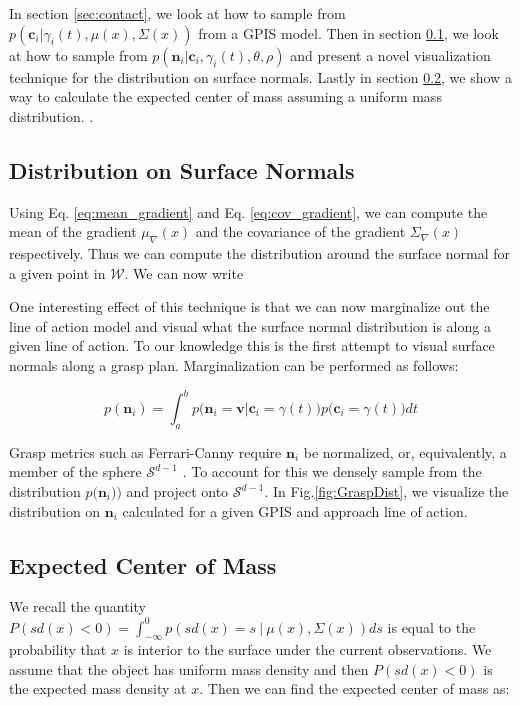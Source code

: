 \documentclass[letterpaper, 10 pt, conference]{ieeeconf}  %
\begin{document}
 In section \ref{sec:contact}, we look at how to sample from $p(\textbf{c}_i|\gamma_i(t),\mu(x),\Sigma(x))$ from a GPIS model. Then in section \ref{sec:normals}, we look at how to sample from $p(\textbf{n}_i|\textbf{c}_i,\gamma_i(t),\theta,\rho)$ and present a novel visualization technique for the distribution on surface normals. Lastly in section \ref{sec:mass}, we show a way to calculate the expected center of mass assuming a uniform mass distribution. 
 .
\subsection{Distribution on Surface Normals}\label{sec:normals} 
Using Eq. \ref{eq:mean_gradient} and Eq. \ref{eq:cov_gradient}, we can compute the mean of the gradient $ \mu_{\nabla}(x)$ and the covariance of the gradient $\Sigma_{\nabla}(x)$ respectively. Thus we can compute the distribution around the surface normal for a given point in $\mathcal{W}$. We can now write 

One interesting effect of this technique is that we can now marginalize out the line of action model and visual what the surface normal distribution is along a given line of action. To our knowledge this is the first attempt to visual surface normals along a grasp plan. Marginalization can be performed as follows:

\vspace{-2ex}
\begin{equation}
    p(\textbf{n}_i ) = \int_a^b   p\big(\textbf{n}_i = \textbf{v} | \textbf{c}_i = \gamma(t) \big)p\big(\textbf{c}_i = \gamma(t)\big) dt \label{eq:normal_dist}
\end{equation}

Grasp metrics such as  Ferrari-Canny require $\textbf{n}_i$ be normalized, or, equivalently, a member of the sphere $\mathcal{S}^{d-1}$ \cite{ferrari1992}. To account for this we densely sample from the  distribution $p \big(\textbf{n}_i ) \big)$  and project onto $\mathcal{S}^{d-1}$.  In Fig.\ref{fig:GraspDist}, we visualize the distribution on $\textbf{n}_i$ calculated for a given GPIS and approach line of action.


\subsection{Expected Center of Mass}\label{sec:mass} 

We recall the quantity $P(sd(x) < 0) = \int_{-\infty}^{0} p(sd(x) =  s \ | \ \mu(x),\Sigma(x)) ds$ is equal to the probability that $x$ is interior to the surface under the current observations.
We assume that the object has uniform mass density and then $P(sd(x) < 0)$ is the expected mass density at $x$.
Then we can find the expected center of mass as:
\end{document}
